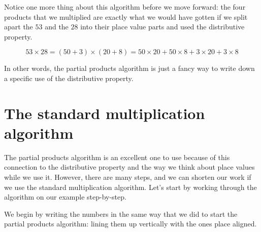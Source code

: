\documentclass{ximera}
\begin{document}
Notice one more thing about this algorithm before we move forward: the four products that we multiplied are exactly what we would have gotten if we split apart the $53$ and the $28$ into their place value parts and used the distributive property.

\[
53 \times 28 = (50 + 3) \times (20 + 8) = 50 \times 20 + 50 \times 8 + 3 \times 20 + 3 \times 8
\]

In other words, the partial products algorithm is just a fancy way to write down a specific use of the distributive property. 


\section{The standard multiplication algorithm}

The partial products algorithm is an excellent one to use because of this connection to the distributive property and the way we think about place values while we use it. However, there are many steps, and we can shorten our work if we use the standard multiplication algorithm. Let's start by working through the algorithm on our example step-by-step.

We begin by writing the numbers in the same way that we did to start the partial products algorithm: lining them up vertically with the ones place aligned. 

\begin{center}
\end{center}
\end{document}
